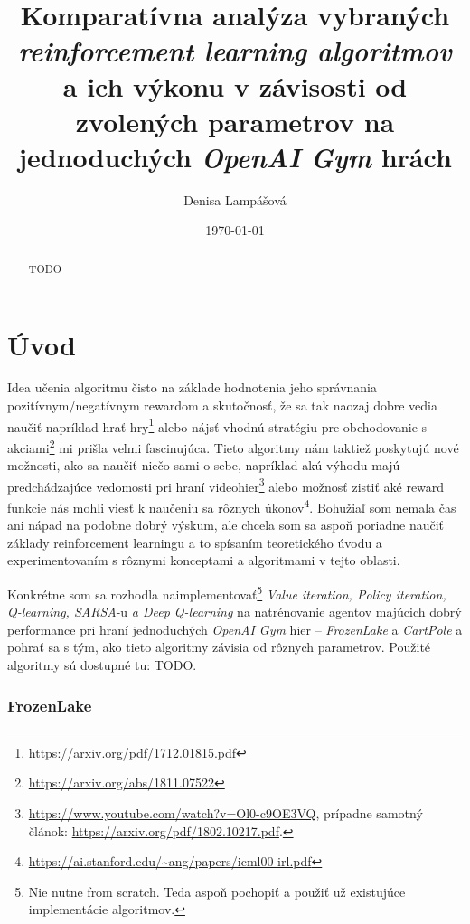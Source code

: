 \documentclass[letterpaper,12pt]{article}
\begin{document}
\title{\large \textbf{Komparatívna analýza vybraných \textit{reinforcement learning algoritmov} a ich výkonu v závisosti od zvolených parametrov \newline na jednoduchých \textit{OpenAI Gym} hrách}}
\author{Denisa Lampášová}
\date{\small \today}
\maketitle

\justify 
\begin{abstract}
TODO
\end{abstract}

\section{Úvod}

\indent\par Idea učenia algoritmu čisto na základe hodnotenia jeho správnania pozitívnym/negatívnym rewardom a skutočnosť, že sa tak naozaj dobre vedia naučiť napríklad hrať hry\footnote{\url{https://arxiv.org/pdf/1712.01815.pdf}} alebo nájsť vhodnú stratégiu pre obchodovanie s akciami\footnote{\url{https://arxiv.org/abs/1811.07522}} mi prišla veľmi fascinujúca. Tieto algoritmy nám taktiež poskytujú nové možnosti, ako sa naučiť niečo sami o sebe, napríklad akú výhodu majú predchádzajúce vedomosti pri hraní videohier\footnote{\url{https://www.youtube.com/watch?v=Ol0-c9OE3VQ}, prípadne samotný článok: \url{https://arxiv.org/pdf/1802.10217.pdf}.} alebo možnosť zistiť aké reward funkcie nás mohli viesť k naučeniu sa rôznych úkonov\footnote{\url{https://ai.stanford.edu/~ang/papers/icml00-irl.pdf}}. Bohužiaľ som nemala čas ani nápad na podobne dobrý výskum, ale chcela som sa aspoň poriadne naučiť základy reinforcement learningu a to spísaním teoretického úvodu a experimentovaním s rôznymi konceptami a algoritmami v tejto oblasti.

Konkrétne som sa rozhodla naimplementovať\footnote{Nie nutne from scratch. Teda aspoň pochopiť a použiť už existujúce implementácie algoritmov.} \textit{Value iteration, Policy iteration, Q-learning, SARSA}-u \textit{a Deep Q-learning} na natrénovanie agentov majúcich dobrý performance pri hraní jednoduchých \textit{OpenAI Gym} hier -- \textit{FrozenLake} a \textit{CartPole} a pohrať sa s tým, ako tieto algoritmy závisia od rôznych parametrov. Použité algoritmy sú dostupné tu: TODO.


\subsubsection*{FrozenLake}
\end{document}
